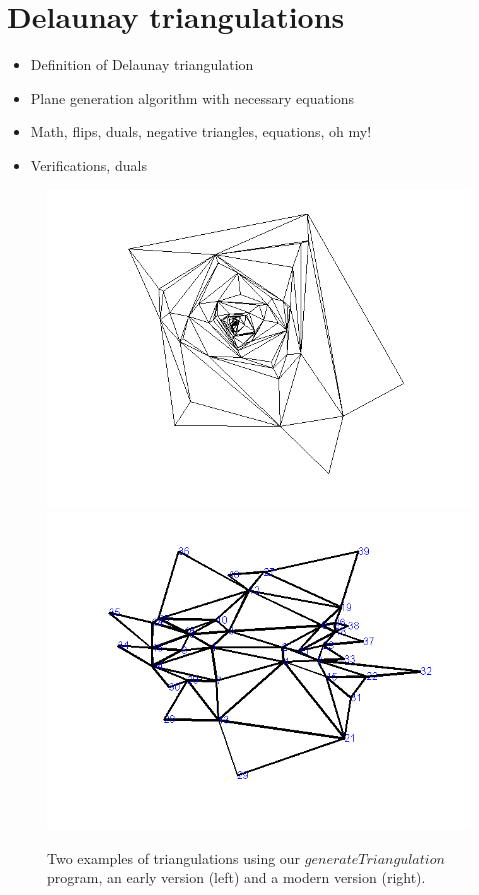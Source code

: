 \documentclass[12pt]{article}
\begin{document}
\section{Delaunay triangulations}
\label{DT}
\begin{itemize}
\item Definition of Delaunay triangulation
\item Plane generation algorithm with necessary equations
\item Math, flips, duals, negative triangles, equations, oh my!
\item Verifications, duals
\end{itemize}

\begin{figure}
\centering
\includegraphics[scale = 0.45]{Pictures/gentri.png}
\includegraphics[scale = 0.45]{Pictures/gentri6.png}
\caption{Two examples of triangulations using our $generateTriangulation$ program, an early version (left) and a modern version (right).}
\end{figure}
\end{document}
